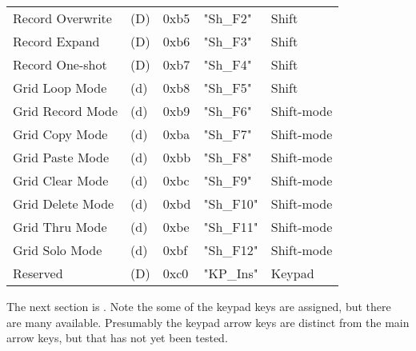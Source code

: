 \begin{table}[htb!]
\begin{tabular}{l l l l l}
        Record Overwrite   & (D)  &  0xb5   & "Sh\_F2"     & Shift \\
        Record Expand      & (D)  &  0xb6   & "Sh\_F3"     & Shift \\
        Record One-shot    & (D)  &  0xb7   & "Sh\_F4"     & Shift \\
        Grid Loop Mode     & (d)  &  0xb8   & "Sh\_F5"     & Shift \\
        Grid Record Mode   & (d)  &  0xb9   & "Sh\_F6"     & Shift-mode \\
        Grid Copy Mode     & (d)  &  0xba   & "Sh\_F7"     & Shift-mode \\
        Grid Paste Mode    & (d)  &  0xbb   & "Sh\_F8"     & Shift-mode \\
        Grid Clear Mode    & (d)  &  0xbc   & "Sh\_F9"     & Shift-mode \\
        Grid Delete Mode   & (d)  &  0xbd   & "Sh\_F10"    & Shift-mode \\
        Grid Thru Mode     & (d)  &  0xbe   & "Sh\_F11"    & Shift-mode \\
        Grid Solo Mode     & (d)  &  0xbf   & "Sh\_F12"    & Shift-mode \\
        Reserved           & (D)  &  0xc0   & "KP\_Ins"    & Keypad \\
      \end{tabular}
   \end{table}

   The next section is .
   Note the some of the keypad keys are assigned, but there are many
   available.  Presumably the keypad arrow keys are distinct from
   the main arrow keys, but that has not yet been tested.

